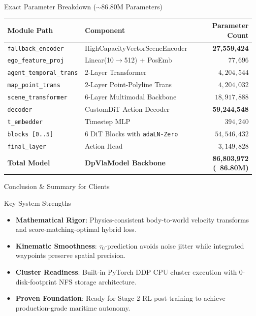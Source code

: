 \documentclass[t]{beamer}
\begin{document}
\begin{frame}{Exact Parameter Breakdown ($\sim 86.80\text{M}$ Parameters)}
    \begin{table}
    \centering
    \footnotesize
    \begin{tabular}{llr}
    \toprule
    \textbf{Module Path} & \textbf{Component} & \textbf{Parameter Count} \\
    \midrule
    \texttt{fallback\_encoder} & HighCapacityVectorSceneEncoder & \textbf{27,559,424} \\
    \quad \texttt{ego\_feature\_proj} & Linear(10$\to$512) + PosEmb & $77,696$ \\
    \quad \texttt{agent\_temporal\_trans} & 2-Layer Transformer & $4,204,544$ \\
    \quad \texttt{map\_point\_trans} & 2-Layer Point-Polyline Trans & $4,204,032$ \\
    \quad \texttt{scene\_transformer} & 6-Layer Multimodal Backbone & $18,917,888$ \\
    \midrule
    \texttt{decoder} & CustomDiT Action Decoder & \textbf{59,244,548} \\
    \quad \texttt{t\_embedder} & Timestep MLP & $394,240$ \\
    \quad \texttt{blocks [0..5]} & 6 DiT Blocks with \texttt{adaLN-Zero} & $54,546,432$ \\
    \quad \texttt{final\_layer} & Action Head & $3,149,828$ \\
    \midrule
    \textbf{Total Model} & \textbf{DpVlaModel Backbone} & \textbf{86,803,972 (~86.80M)} \\
    \bottomrule
    \end{tabular}
    \end{table}
\end{frame}

\begin{frame}{Conclusion \& Summary for Clients}
    \begin{block}{Key System Strengths}
        \begin{itemize}
            \item \textbf{Mathematical Rigor}: Physics-consistent body-to-world velocity transforms and score-matching-optimal hybrid loss.
            \item \textbf{Kinematic Smoothness}: $\tau_0$-prediction avoids noise jitter while integrated waypoints preserve spatial precision.
            \item \textbf{Cluster Readiness}: Built-in PyTorch DDP CPU cluster execution with 0-disk-footprint NFS storage architecture.
            \item \textbf{Proven Foundation}: Ready for Stage 2 RL post-training to achieve production-grade maritime autonomy.
        \end{itemize}
    \end{block}
\end{frame}
\end{document}
